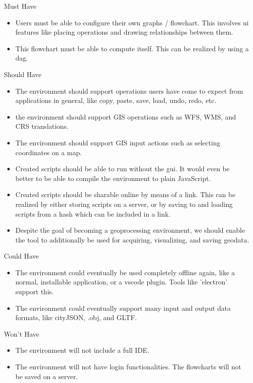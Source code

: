 Must Have
\begin{itemize}
  \item Users must be able to configure their own graphs / flowchart. This involves \ac{ui} features like placing operations and drawing relationships between them. 
  \item This flowchart must be able to compute itself. This can be realized by using a \ac{dag}.
\end{itemize}

Should Have
\begin{itemize}
  \item The environment should support operations users have come to expect from applications in general, 
  like copy, paste, save, load, undo, redo, etc. 
  \item the environment should support GIS operations such as WFS, WMS, and CRS translations.
  \item The environment should support GIS input actions such as selecting coordinates on a map.  
  \item Created scripts should be able to run without the \ac{gui}. It would even be better to be able to compile the environment to plain JavaScript. 
  \item Created scripts should be sharable online by means of a link. This can be realized by either storing scripts on a server, or by saving to and loading scripts from a hash which can be included in a link. 
  \item Despite the goal of becoming a geoprocessing environment, we should enable the tool to additionally be used for acquiring, visualizing, and saving geodata.
 
\end{itemize}

Could Have
\begin{itemize}
  \item The environment could eventually be used completely offline again, like a normal, installable application, or a vscode plugin. Tools like 'electron' support this. 
  \item The environment could eventually support many input and output data formats, like cityJSON, .obj, and GLTF. 

\end{itemize}

Won't Have
\begin{itemize}
  \item The environment will not include a full IDE.
  \item The environment will not have login functionalities. The flowcharts will not be saved on a server.  
\end{itemize}



